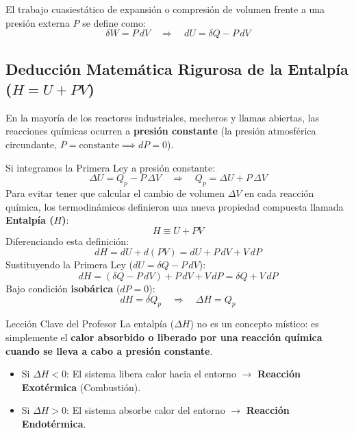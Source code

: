 \documentclass[11pt,letterpaper]{report}
\begin{document}
El trabajo cuasiestático de expansión o compresión de volumen frente a una presión externa $P$ se define como:
\begin{equation}
    \delta W = P\,dV \quad \Longrightarrow \quad dU = \delta Q - P\,dV
\end{equation}

\subsection{Deducción Matemática Rigurosa de la Entalpía ($H = U + PV$)}
En la mayoría de los reactores industriales, mecheros y llamas abiertas, las reacciones químicas ocurren a \textbf{presión constante} (la presión atmosférica circundante, $P = \text{constante} \implies dP = 0$).

Si integramos la Primera Ley a presión constante:
\begin{equation}
    \Delta U = Q_p - P\,\Delta V \quad \Longrightarrow \quad Q_p = \Delta U + P\,\Delta V
\end{equation}
Para evitar tener que calcular el cambio de volumen $\Delta V$ en cada reacción química, los termodinámicos definieron una nueva propiedad compuesta llamada \textbf{Entalpía ($H$)}:
\begin{equation}
    H \equiv U + PV
\end{equation}
Diferenciando esta definición:
\begin{equation}
    dH = dU + d(PV) = dU + P\,dV + V\,dP
\end{equation}
Sustituyendo la Primera Ley ($dU = \delta Q - P\,dV$):
\begin{equation}
    dH = (\delta Q - P\,dV) + P\,dV + V\,dP = \delta Q + V\,dP
\end{equation}
Bajo condición \textbf{isobárica} ($dP = 0$):
\begin{equation}
    dH = \delta Q_p \quad \Longrightarrow \quad \Delta H = Q_p
\end{equation}

\begin{conceptbox}{Lección Clave del Profesor}
La entalpía ($\Delta H$) no es un concepto místico: es simplemente el \textbf{calor absorbido o liberado por una reacción química cuando se lleva a cabo a presión constante}.
\begin{itemize}
    \item Si $\Delta H < 0$: El sistema libera calor hacia el entorno $\longrightarrow$ \textbf{Reacción Exotérmica} (Combustión).
    \item Si $\Delta H > 0$: El sistema absorbe calor del entorno $\longrightarrow$ \textbf{Reacción Endotérmica}.
\end{itemize}
\end{conceptbox}
\end{document}
